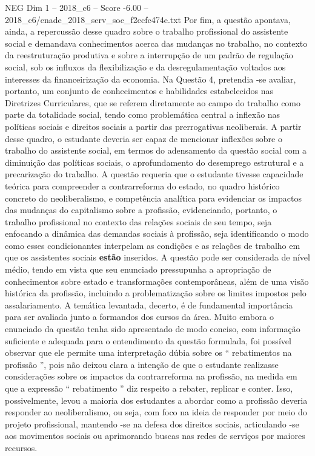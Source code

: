 \begin{textsample}{NEG Dim 1 – 2018\_c6 – Score -6.00 – 2018\_c6/enade\_2018\_serv\_soc\_f2ecfc474e.txt}
Por fim, a questão apontava, ainda, a repercussão desse quadro sobre o trabalho profissional do assistente social e demandava conhecimentos acerca das mudanças no trabalho, no contexto da reestruturação produtiva e sobre a interrupção de um padrão de regulação social, sob os influxos da flexibilização e da desregulamentação voltados aos interesses da financeirização da economia.
Na Questão 4, pretendia -se avaliar, portanto, um conjunto de conhecimentos e habilidades estabelecidos nas Diretrizes Curriculares, que se referem diretamente ao campo do trabalho como parte da totalidade social, tendo como problemática central a inflexão nas políticas sociais e direitos sociais a partir das prerrogativas neoliberais.
A partir desse quadro, o estudante deveria ser capaz de mencionar inflexões sobre o trabalho do assistente social, em termos do adensamento da questão social com a diminuição das políticas sociais, o aprofundamento do desemprego estrutural e a precarização do trabalho.
A questão requeria que o estudante tivesse capacidade teórica para compreender a contrarreforma do estado, no quadro histórico concreto do neoliberalismo, e competência analítica para evidenciar os impactos das mudanças do capitalismo sobre a profissão, evidenciando, portanto, o trabalho profissional no contexto das relações sociais de seu tempo, seja enfocando a dinâmica das demandas sociais à profissão, seja identificando o modo como esses condicionantes interpelam as condições e as relações de trabalho em que os assistentes sociais \textbf{estão} inseridos.
A questão pode ser considerada de nível médio, tendo em vista que seu enunciado pressupunha a apropriação de conhecimentos sobre estado e transformações contemporâneas, além de uma visão histórica da profissão, incluindo a problematização sobre os limites impostos pelo assalariamento.
A temática levantada, decerto, é de fundamental importância para ser avaliada junto a formandos dos cursos da área.
Muito embora o enunciado da questão tenha sido apresentado de modo conciso, com informação suficiente e adequada para o entendimento da questão formulada, foi possível observar que ele permite uma interpretação dúbia sobre os “ rebatimentos na profissão ”, pois não deixou clara a intenção de que o estudante realizasse considerações sobre os impactos da contrarreforma na profissão, na medida em que a expressão “ rebatimento ” diz respeito a rebater, replicar e conter.
Isso, possivelmente, levou a maioria dos estudantes a abordar como a profissão deveria responder ao neoliberalismo, ou seja, com foco na ideia de responder por meio do projeto profissional, mantendo -se na defesa dos direitos sociais, articulando -se aos movimentos sociais ou aprimorando buscas nas redes de serviços por maiores recursos.

\end{textsample}
